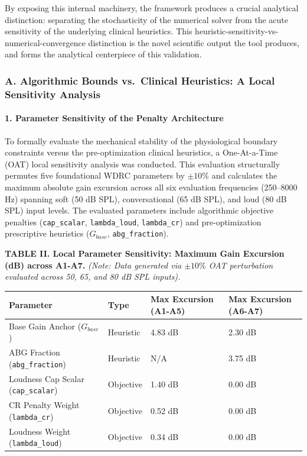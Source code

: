\documentclass[
  12pt,
]{article}
\begin{document}
By exposing this internal machinery, the framework produces a crucial
analytical distinction: separating the stochasticity of the numerical
solver from the acute sensitivity of the underlying clinical heuristics.
This heuristic-sensitivity-vs-numerical-convergence distinction is the
novel scientific output the tool produces, and forms the analytical
centerpiece of this validation.

\subsubsection{A. Algorithmic Bounds vs.~Clinical Heuristics: A Local
Sensitivity
Analysis}\label{a.-algorithmic-bounds-vs.-clinical-heuristics-a-local-sensitivity-analysis}

\paragraph{1. Parameter Sensitivity of the Penalty
Architecture}\label{parameter-sensitivity-of-the-penalty-architecture}

To formally evaluate the mechanical stability of the physiological
boundary constraints versus the pre-optimization clinical heuristics, a
One-At-a-Time (OAT) local sensitivity analysis was conducted. This
evaluation structurally permutes five foundational WDRC parameters by
\(\pm 10\%\) and calculates the maximum absolute gain excursion across
all six evaluation frequencies (250--8000 Hz) spanning soft (50 dB SPL),
conversational (65 dB SPL), and loud (80 dB SPL) input levels. The
evaluated parameters include algorithmic objective penalties
(\texttt{cap\_scalar}, \texttt{lambda\_loud}, \texttt{lambda\_cr}) and
pre-optimization prescriptive heuristics (\(G_{base}\),
\texttt{abg\_fraction}).

\textbf{TABLE II. Local Parameter Sensitivity: Maximum Gain Excursion
(dB) across A1-A7.} \emph{(Note: Data generated via \(\pm 10\%\) OAT
perturbation evaluated across 50, 65, and 80 dB SPL inputs).}

\begin{longtable}[]{@{}llll@{}}
\toprule\noalign{}
Parameter & Type & Max Excursion (A1-A5) & Max Excursion (A6-A7) \\
\midrule\noalign{}
\endhead
\bottomrule\noalign{}
\endlastfoot
Base Gain Anchor (\(G_{base}\)) & Heuristic & 4.83 dB & 2.30 dB \\
ABG Fraction (\texttt{abg\_fraction}) & Heuristic & N/A & 3.75 dB \\
Loudness Cap Scalar (\texttt{cap\_scalar}) & Objective & 1.40 dB & 0.00
dB \\
CR Penalty Weight (\texttt{lambda\_cr}) & Objective & 0.52 dB & 0.00
dB \\
Loudness Weight (\texttt{lambda\_loud}) & Objective & 0.34 dB & 0.00
dB \\
\end{longtable}
\end{document}
